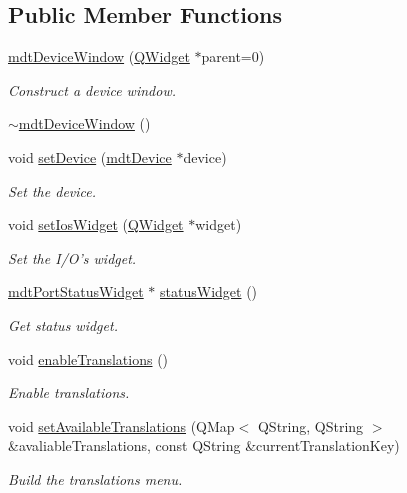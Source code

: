 \subsection*{Public Member Functions}
\begin{DoxyCompactItemize}
\item 
\hyperlink{classmdt_device_window_a92771aaaa091fa653e3c3776b7e115a0}{mdt\-Device\-Window} (\hyperlink{class_q_widget}{Q\-Widget} $\ast$parent=0)
\begin{DoxyCompactList}\small\item\em Construct a device window. \end{DoxyCompactList}\item 
\hyperlink{classmdt_device_window_a524c337f25aab00d77ade7229e5f01a9}{$\sim$mdt\-Device\-Window} ()
\item 
void \hyperlink{classmdt_device_window_ac3bed35b2eeb88b2483c18e3b9bb918d}{set\-Device} (\hyperlink{classmdt_device}{mdt\-Device} $\ast$device)
\begin{DoxyCompactList}\small\item\em Set the device. \end{DoxyCompactList}\item 
void \hyperlink{classmdt_device_window_a63df49a9f0cafc2f72e097aa0cf26baa}{set\-Ios\-Widget} (\hyperlink{class_q_widget}{Q\-Widget} $\ast$widget)
\begin{DoxyCompactList}\small\item\em Set the I/\-O's widget. \end{DoxyCompactList}\item 
\hyperlink{classmdt_port_status_widget}{mdt\-Port\-Status\-Widget} $\ast$ \hyperlink{classmdt_device_window_a5bad625542c9df270d31d4beec4c9e95}{status\-Widget} ()
\begin{DoxyCompactList}\small\item\em Get status widget. \end{DoxyCompactList}\item 
void \hyperlink{classmdt_device_window_a8b884e389fa27f85742642193d18b8f9}{enable\-Translations} ()
\begin{DoxyCompactList}\small\item\em Enable translations. \end{DoxyCompactList}\item 
void \hyperlink{classmdt_device_window_a781a7511b7fbf586fcd39e2aa44e91fd}{set\-Available\-Translations} (Q\-Map$<$ Q\-String, Q\-String $>$ \&avaliable\-Translations, const Q\-String \&current\-Translation\-Key)
\begin{DoxyCompactList}\small\item\em Build the translations menu. \end{DoxyCompactList}\end{DoxyCompactItemize}
